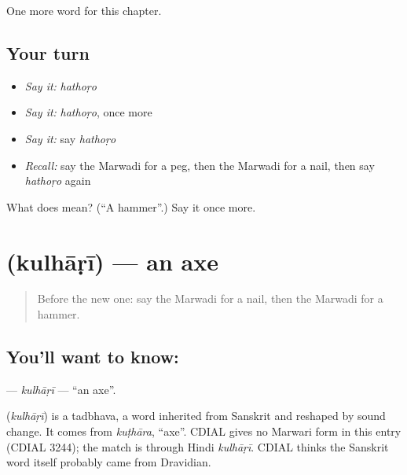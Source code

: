 \begin{grammarlens}[title={What you've built}]
One more word for this chapter.
\end{grammarlens}

\subsection*{Your turn}
\begin{itemize}
\raggedright
  \item \emph{Say it:} \emph{hathoṛo}
  \item \emph{Say it:} \emph{hathoṛo}, once more
  \item \emph{Say it:} say \emph{hathoṛo}
  \item \emph{Recall:} say the Marwadi for a peg, then the Marwadi for a nail, then say \emph{hathoṛo} again
\end{itemize}

\begin{tcolorbox}[breakable,colback=teal!4,colframe=teal!35!black,title={Before you move on}]
What does  mean? (\textquotedblleft{}A hammer\textquotedblright{}.) Say it once more.
\end{tcolorbox}
\section[\texorpdfstring{\mw{कुल्हाड़ी} (kulhāṛī)}{कुल्हाड़ी (kulhāṛī)}]{ (kulhāṛī) — an axe}

\label{lesson:MW-C127-kulhari}



\begin{quote}
Before the new one: say the Marwadi for a nail, then the Marwadi for a hammer.
\end{quote}

\subsection*{You'll want to know: }
\textbf{} — \emph{kulhāṛī} — \textquotedblleft{}an axe\textquotedblright{}.

\begin{cousinweb}
\textbf{} (\emph{kulhāṛī}) is a tadbhava, a word inherited from Sanskrit and reshaped by sound change. It comes from \emph{kuṭhāra}, \textquotedblleft{}axe\textquotedblright{}. CDIAL gives no Marwari form in this entry (CDIAL 3244); the match is through Hindi \emph{kulhāṛī}. CDIAL thinks the Sanskrit word itself probably came from Dravidian.
\end{cousinweb}


